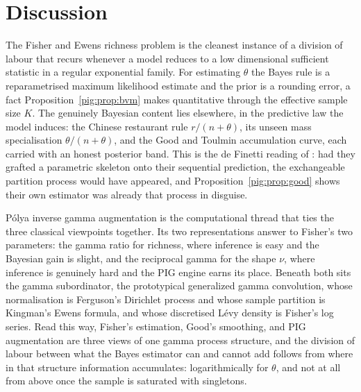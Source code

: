 \section{Discussion}\label{pig:sec:discussion}

The Fisher and Ewens richness problem is the cleanest instance of a division of labour that recurs whenever a model reduces to a low dimensional sufficient statistic in a regular exponential family. For estimating $\theta$ the Bayes rule is a reparametrised maximum likelihood estimate and the prior is a rounding error, a fact Proposition~\ref{pig:prop:bvm} makes quantitative through the effective sample size $K$. The genuinely Bayesian content lies elsewhere, in the predictive law the model induces: the Chinese restaurant rule $r/(n+\theta)$, its unseen mass specialisation $\theta/(n+\theta)$, and the Good and Toulmin accumulation curve, each carried with an honest posterior band. This is the de Finetti reading of \citet{pig:goodtoulmin1956}: had they grafted a parametric skeleton onto their sequential prediction, the exchangeable partition process would have appeared, and Proposition~\ref{pig:prop:good} shows their own estimator was already that process in disguise.

P\'olya inverse gamma augmentation is the computational thread that ties the three classical viewpoints together. Its two representations answer to Fisher's two parameters: the gamma ratio for richness, where inference is easy and the Bayesian gain is slight, and the reciprocal gamma for the shape $\nu$, where inference is genuinely hard and the PIG engine earns its place. Beneath both sits the gamma subordinator, the prototypical generalized gamma convolution, whose normalisation is Ferguson's Dirichlet process and whose sample partition is Kingman's Ewens formula, and whose discretised L\'evy density is Fisher's log series. Read this way, Fisher's estimation, Good's smoothing, and PIG augmentation are three views of one gamma process structure, and the division of labour between what the Bayes estimator can and cannot add follows from where in that structure information accumulates: logarithmically for $\theta$, and not at all from above once the sample is saturated with singletons.

